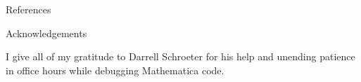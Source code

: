 \documentclass[final]{beamer}
\newlength{\onecolwid}
\begin{document}
\begin{frame}[t]
\begin{columns}[t]
\begin{column}{\onecolwid}
\vspace{3.0cm}




\begin{block}{References}

\nocite{*} %
\small{
}


\end{block}

\vspace{3.0cm}



\begin{block}{Acknowledgements}

{\Large I give all of my gratitude to Darrell Schroeter for his help and unending patience in office hours while debugging Mathematica code.}

\end{block}

\vspace{3.0cm}






\end{column}
\end{columns}
\end{frame}
\end{document}
